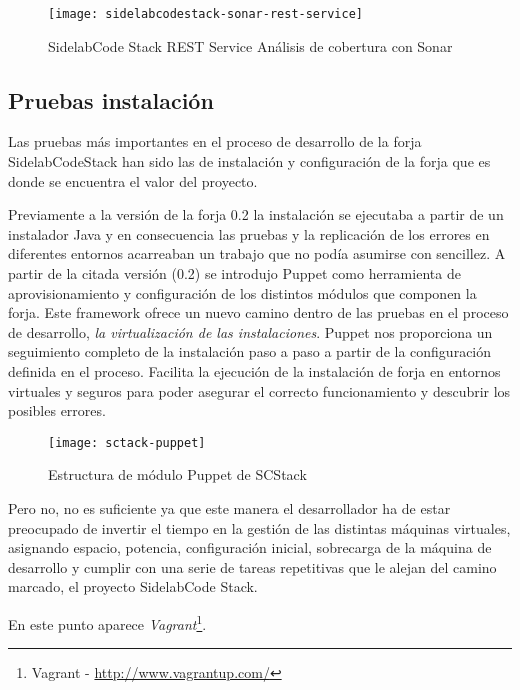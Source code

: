 \begin{figure}[H]
    \centering
    \texttt{[image: sidelabcodestack-sonar-rest-service]}
    \caption{SidelabCode Stack REST Service Análisis de cobertura con Sonar}
    \label{fig:sidelabcodestack-sonar-rest-service}
\end{figure}

\subsection{Pruebas instalación}
\label{sub:pruebas-instalacion}

\par Las pruebas más importantes en el proceso de desarrollo de la forja SidelabCodeStack han sido las de instalación y configuración de la forja que es donde se encuentra el valor del proyecto. 

\par Previamente a la versión de la forja 0.2 la instalación se ejecutaba a partir de un instalador Java y en consecuencia las pruebas y la replicación de los errores en diferentes entornos acarreaban un trabajo que no podía asumirse con sencillez. A partir de la citada versión (0.2) se introdujo Puppet como herramienta de aprovisionamiento y configuración de los distintos módulos que componen la forja. Este framework ofrece un nuevo camino dentro de las pruebas en el proceso de desarrollo, \emph{la virtualización de las instalaciones}. Puppet nos proporciona un seguimiento completo de la instalación paso a paso a partir de la configuración definida en el proceso. Facilita la ejecución de la instalación de forja en entornos virtuales y seguros para poder asegurar el correcto funcionamiento y descubrir los posibles errores.

\begin{figure}[H]
    \centering
    \texttt{[image: sctack-puppet]}
    \caption{Estructura de módulo Puppet de SCStack}
    \label{sctack-puppet}
\end{figure}

\par Pero no, no es suficiente ya que este manera el desarrollador ha de estar preocupado de invertir el tiempo en la gestión de las distintas máquinas virtuales, asignando espacio, potencia, configuración inicial, sobrecarga de la máquina de desarrollo y cumplir con una serie de tareas repetitivas que le alejan del camino marcado, el proyecto SidelabCode Stack.

\par En este punto aparece \emph{Vagrant}\footnote{Vagrant - \url{http://www.vagrantup.com/}}.

